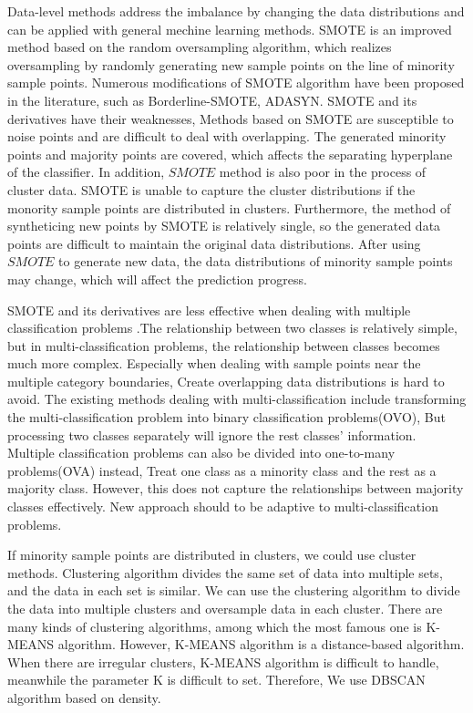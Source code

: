 \documentclass[runningheads]{llncs}
\begin{document}

Data-level methods address the imbalance by changing the data distributions and can be 
applied with general mechine learning methods.
SMOTE is an improved method based on the random oversampling algorithm, 
which realizes 
oversampling by randomly generating new sample points 
on the line of minority sample points.
Numerous modifications of SMOTE algorithm have been proposed in the literature, such as
Borderline-SMOTE\cite{2005Borderline}, ADASYN\cite{2008ADASYN}. SMOTE and its derivatives have their weaknesses,
Methods based on SMOTE are susceptible to noise points and are difficult to deal with overlapping.
The generated minority points and majority points are covered, 
which affects the separating hyperplane of the classifier. In addition, $SMOTE$ method is also poor in the process
of cluster data. SMOTE is unable to capture the cluster distributions
if the monority sample points are distributed in clusters.
Furthermore,
the method of syntheticing new points by SMOTE is relatively single,
so the generated data points are difficult to maintain the 
original data distributions\cite{2008DATA}.
After using $SMOTE$ to generate new data, 
the data distributions of minority sample points may change, which will affect the prediction progress.


 SMOTE and its derivatives are less effective when dealing with multiple classification problems 
 \cite{2020Combined,2011LIBSVM}.The relationship between two classes is relatively simple,
but in multi-classification problems, the relationship between classes becomes much more complex\cite{2017Relevance}.
Especially when dealing with sample points near the multiple category boundaries, 
Create overlapping data distributions\cite{Jierui2013Overlapping} is hard to avoid.
The existing methods dealing with multi-classification include transforming 
the multi-classification problem into binary classification problems(OVO)\cite{articlemulti}, 
But processing two classes separately will ignore the rest classes' information.
Multiple classification problems can also be divided into one-to-many problems(OVA) instead,
Treat one class as a minority class and the rest as a majority class.
However, this does not capture the relationships between majority classes effectively.
New approach should to be adaptive to multi-classification problems.

If minority sample points are distributed in clusters, we could use cluster methods.
Clustering algorithm\cite{2011Data,inproceedings} divides the same set of data into multiple sets, 
and the data in each set is similar. We can use the clustering algorithm 
to divide the data into multiple clusters and oversample data in each cluster. There are many kinds of clustering algorithms, 
among which the most famous one is K-MEANS\cite{2007K} algorithm.
However, K-MEANS algorithm is a distance-based algorithm. 
When there are irregular clusters, K-MEANS algorithm is difficult to handle, 
meanwhile the parameter K is difficult to set. Therefore, 
We use DBSCAN\cite{2013Mining} algorithm based on density.
\end{document}
